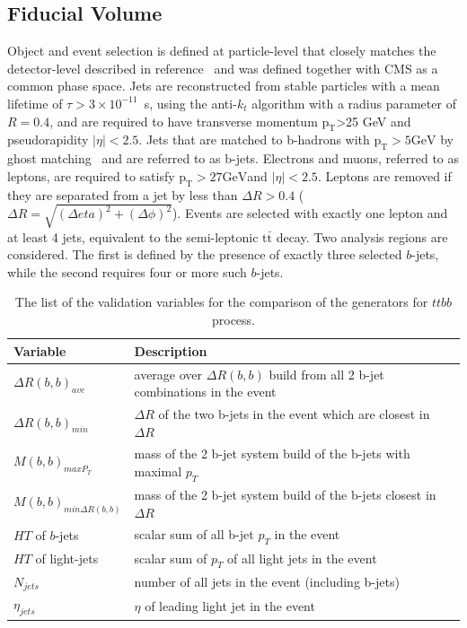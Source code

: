 \subsection{Fiducial Volume}
Object and event selection is defined at particle-level that closely matches the detector-level described in reference~\cite{HIGG-2017-03} and was defined together with CMS as a common phase space. Jets are reconstructed from stable particles with a mean lifetime of $\tau > 3\times 10^{-11}$~s, using the anti-$k_t$ algorithm with a radius parameter of $R=0.4$, and are required to have transverse momentum $\mathrm{p_{T}}$>25 GeV and pseudorapidity $|\eta|< 2.5$. Jets that are matched to b-hadrons with $\mathrm{p_{T}>5 GeV}$ by ghost matching~\cite{Cacciari:2008gn} and are referred to as b-jets. Electrons and muons, referred to as leptons, are required to satisfy $\mathrm{p_{T}>27 GeV}$and $|\eta|< 2.5$. 
Leptons are removed if they are separated from a jet by less than $\Delta R>0.4$ ($\Delta R = \sqrt{(\Delta eta )^2 + (\Delta \phi)^2}$).
Events are selected with exactly one lepton and at least 4 jets, equivalent to the semi-leptonic $\mathrm{t\bar{t}}$ decay.
Two analysis regions are considered. The first is defined by the presence of exactly three selected $b$-jets, while the second requires four or more such $b$-jets.


\begin{table}[]
\begin{center}
\caption{\label{tab:ttbb_varlist}
The list of the validation variables for the comparison of the generators for $ttbb$ process.}
\vspace{0.25cm}
{\small
\setlength\tabcolsep{1.5pt}
\begin{tabular}{l|l}
\hline\hline
Variable & Description  \\ \hline
$\Delta R (b,b)_{ave}$&    average over $\Delta R(b, b)$ build from all 2 b-jet combinations in the event           \\ 
$\Delta R (b,b)_{min}$ &    $\Delta R$ of the two b-jets in the event which are closest in $\Delta R $          \\ 
$M (b,b)_{maxP_T}$ &      mass of the 2 b-jet system build of the b-jets with maximal $p_T$         \\ 
$M (b,b)_{min\Delta R(b,b)}$ &         mass of the 2 b-jet system build of the b-jets closest in $\Delta R $     \\ 
$HT$ of $b$-jets&           scalar sum of all b-jet $p_T$ in the event    \\ 
$HT$ of light-jets&        scalar sum of $p_T$ of all light jets in the event       \\ 
$N_{jets}$   &     number of all jets in the event (including b-jets)          \\ 
$\eta_{jets}$ &          $\eta$ of leading light jet in the event     \\ 
    \hline\hline    
\end{tabular}
}
\end{center}
\end{table}




